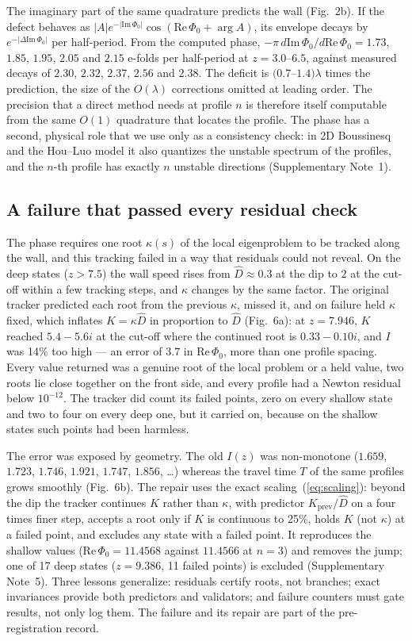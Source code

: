 \documentclass[11pt]{article}
\newcommand{\Dh}{\hat D}
\newcommand{\ReP}{\mathrm{Re}\,\Phi_0}
\newcommand{\ImP}{\mathrm{Im}\,\Phi_0}
\begin{document}
The imaginary part of the same quadrature predicts the wall (Fig.~2b). If the defect behaves as
$|A|e^{-|\ImP|}\cos(\ReP+\arg A)$\cite{bender1978,chapman1998}, its envelope decays by $e^{-|\Delta\ImP|}$ per
half-period. From the computed phase, $-\pi\,d\ImP/d\ReP=1.73$, $1.85$, $1.95$, $2.05$ and $2.15$ e-folds per
half-period at $z=3.0$--$6.5$, against measured decays of $2.30$, $2.32$, $2.37$, $2.56$ and $2.38$. The deficit is
$(0.7$--$1.4)\lambda$ times the prediction, the size of the $O(\lambda)$ corrections omitted at leading order. The
precision that a direct method needs at profile $n$ is therefore itself computable from the same $O(1)$ quadrature
that locates the profile. The phase has a second, physical role that we use only as a consistency check: in 2D
Boussinesq and the Hou--Luo model\cite{choi2017} it also quantizes the unstable spectrum of the profiles, and the
$n$-th profile has exactly $n$ unstable directions (Supplementary Note~1).

\subsection*{A failure that passed every residual check}

The phase requires one root $\kappa(s)$ of the local eigenproblem to be tracked along the wall, and this tracking
failed in a way that residuals could not reveal. On the deep states ($z>7.5$) the wall speed rises from $\Dh\approx0.3$
at the dip to $2$ at the cut-off within a few tracking steps, and $\kappa$ changes by the same factor. The original
tracker predicted each root from the previous $\kappa$, missed it, and on failure held $\kappa$ fixed, which inflates
$K=\kappa\Dh$ in proportion to $\Dh$ (Fig.~6a): at $z=7.946$, $K$ reached $5.4-5.6i$ at the cut-off where the
continued root is $0.33-0.10i$, and $I$ was 14\% too high --- an error of $3.7$ in $\ReP$, more than one profile
spacing. Every value returned was a genuine root of the local problem or a held value, two roots lie close together on
the front side, and every profile had a Newton residual below $10^{-12}$. The tracker did count its failed points, zero
on every shallow state and two to four on every deep one, but it carried on, because on the shallow states such
points had been harmless.

The error was exposed by geometry. The old $I(z)$ was non-monotone ($1.659$, $1.723$, $1.746$, $1.921$, $1.747$,
$1.856$, \dots) whereas the travel time $T$ of the same profiles grows smoothly (Fig.~6b). The repair uses the exact
scaling~(\ref{eq:scaling}): beyond the dip the tracker continues $K$ rather than $\kappa$, with predictor
$K_{\mathrm{prev}}/\Dh$ on a four times finer step, accepts a root only if $K$ is continuous to 25\%, holds $K$ (not
$\kappa$) at a failed point, and excludes any state with a failed point. It reproduces the shallow values
($\ReP=11.4568$ against $11.4566$ at $n=3$) and removes the jump; one of 17 deep states ($z=9.386$, 11 failed points)
is excluded (Supplementary Note~5). Three lessons generalize: residuals certify roots, not branches; exact invariances provide both
predictors and validators; and failure counters must gate results, not only log them. The failure and its repair are
part of the pre-registration record.
\end{document}
